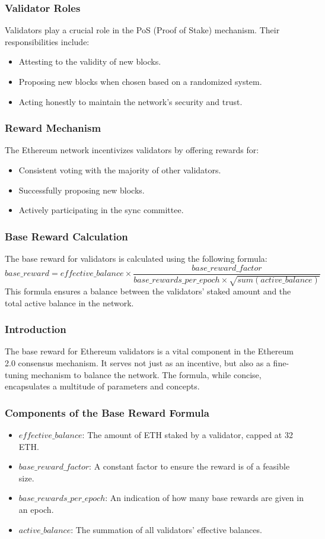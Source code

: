 \documentclass{beamer}
\begin{document}
\begin{frame}
    \frametitle{Validator Roles}
    Validators play a crucial role in the PoS (Proof of Stake) mechanism. Their responsibilities include:
    \begin{itemize}
        \item Attesting to the validity of new blocks.
        \item Proposing new blocks when chosen based on a randomized system.
        \item Acting honestly to maintain the network's security and trust.
    \end{itemize}
\end{frame}

\begin{frame}
    \frametitle{Reward Mechanism}
    The Ethereum network incentivizes validators by offering rewards for:
    \begin{itemize}
        \item Consistent voting with the majority of other validators.
        \item Successfully proposing new blocks.
        \item Actively participating in the sync committee.
    \end{itemize}
\end{frame}

\begin{frame}
    \frametitle{Base Reward Calculation}
    \scriptsize
    The base reward for validators is calculated using the following formula:
    \begin{equation*}
        base\_reward = effective\_balance \times \frac{base\_reward\_factor}{base\_rewards\_per\_epoch \times \sqrt{sum(active\_balance)}}
    \end{equation*}
    This formula ensures a balance between the validators' staked amount and the total active balance in the network.
\end{frame}
\begin{frame}
    \frametitle{Introduction}
    The base reward for Ethereum validators is a vital component in the Ethereum 2.0 consensus mechanism. It serves not just as an incentive, but also as a fine-tuning mechanism to balance the network. The formula, while concise, encapsulates a multitude of parameters and concepts.
\end{frame}

\begin{frame}
    \frametitle{Components of the Base Reward Formula}
    \begin{itemize}
        \item \(effective\_balance\): The amount of ETH staked by a validator, capped at 32 ETH.
        \item \(base\_reward\_factor\): A constant factor to ensure the reward is of a feasible size.
        \item \(base\_rewards\_per\_epoch\): An indication of how many base rewards are given in an epoch.
        \item \(active\_balance\): The summation of all validators' effective balances.
    \end{itemize}
\end{frame}
\end{document}

